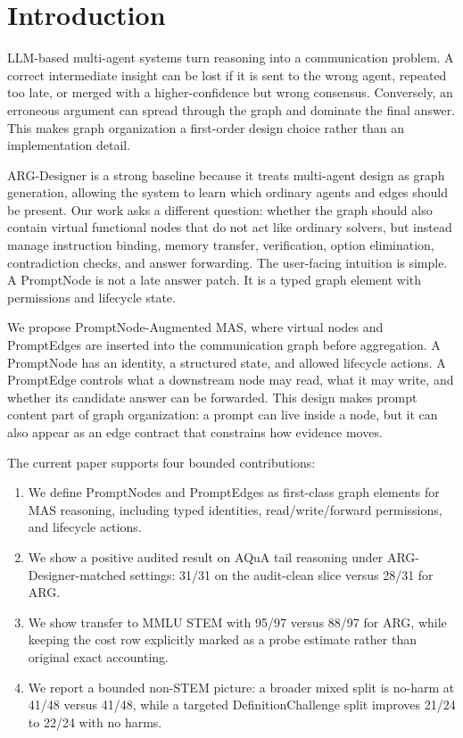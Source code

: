 \section{Introduction}
\label{sec:introduction}

LLM-based multi-agent systems turn reasoning into a communication problem. A correct intermediate insight can be lost if it is sent to the wrong agent, repeated too late, or merged with a higher-confidence but wrong consensus. Conversely, an erroneous argument can spread through the graph and dominate the final answer. This makes graph organization a first-order design choice rather than an implementation detail.

ARG-Designer is a strong baseline because it treats multi-agent design as graph generation, allowing the system to learn which ordinary agents and edges should be present. Our work asks a different question: whether the graph should also contain virtual functional nodes that do not act like ordinary solvers, but instead manage instruction binding, memory transfer, verification, option elimination, contradiction checks, and answer forwarding. The user-facing intuition is simple. A PromptNode is not a late answer patch. It is a typed graph element with permissions and lifecycle state.

We propose PromptNode-Augmented MAS, where virtual nodes and PromptEdges are inserted into the communication graph before aggregation. A PromptNode has an identity, a structured state, and allowed lifecycle actions. A PromptEdge controls what a downstream node may read, what it may write, and whether its candidate answer can be forwarded. This design makes prompt content part of graph organization: a prompt can live inside a node, but it can also appear as an edge contract that constrains how evidence moves.

The current paper supports four bounded contributions:
\begin{enumerate}
    \item We define PromptNodes and PromptEdges as first-class graph elements for MAS reasoning, including typed identities, read/write/forward permissions, and lifecycle actions.
    \item We show a positive audited result on AQuA tail reasoning under ARG-Designer-matched settings: 31/31 on the audit-clean slice versus 28/31 for ARG.
    \item We show transfer to MMLU STEM with 95/97 versus 88/97 for ARG, while keeping the cost row explicitly marked as a probe estimate rather than original exact accounting.
    \item We report a bounded non-STEM picture: a broader mixed split is no-harm at 41/48 versus 41/48, while a targeted DefinitionChallenge split improves 21/24 to 22/24 with no harms.
\end{enumerate}

